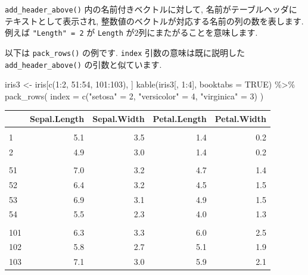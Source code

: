 \documentclass[
  11pt,
  lualatex,
  ja=standard]{bxjsreport}
\newenvironment{Shaded}{\begin{snugshade}}{\end{snugshade}}
\newcommand{\AttributeTok}[1]{\textcolor[rgb]{0.77,0.63,0.00}{#1}}
\newcommand{\ConstantTok}[1]{\textcolor[rgb]{0.00,0.00,0.00}{#1}}
\newcommand{\DecValTok}[1]{\textcolor[rgb]{0.00,0.00,0.81}{#1}}
\newcommand{\FunctionTok}[1]{\textcolor[rgb]{0.00,0.00,0.00}{#1}}
\newcommand{\NormalTok}[1]{#1}
\newcommand{\OtherTok}[1]{\textcolor[rgb]{0.56,0.35,0.01}{#1}}
\newcommand{\SpecialCharTok}[1]{\textcolor[rgb]{0.00,0.00,0.00}{#1}}
\newcommand{\StringTok}[1]{\textcolor[rgb]{0.31,0.60,0.02}{#1}}
\begin{document}
\texttt{add\_header\_above()} 内の名前付きベクトルに対して, 名前がテーブルヘッダにテキストとして表示され, 整数値のベクトルが対応する名前の列の数を表します. 例えば \texttt{"Length" = 2} が \texttt{Length} が2列にまたがることを意味します.

以下は \texttt{pack\_rows()} の例です. \texttt{index} 引数の意味は既に説明した \texttt{add\_header\_above()} の引数と似ています.

\begin{Shaded}
\begin{Highlighting}[numbers=left,,]
\NormalTok{iris3 }\OtherTok{\textless{}{-}}\NormalTok{ iris[}\FunctionTok{c}\NormalTok{(}\DecValTok{1}\SpecialCharTok{:}\DecValTok{2}\NormalTok{, }\DecValTok{51}\SpecialCharTok{:}\DecValTok{54}\NormalTok{, }\DecValTok{101}\SpecialCharTok{:}\DecValTok{103}\NormalTok{), ]}
\FunctionTok{kable}\NormalTok{(iris3[, }\DecValTok{1}\SpecialCharTok{:}\DecValTok{4}\NormalTok{], }\AttributeTok{booktabs =} \ConstantTok{TRUE}\NormalTok{) }\SpecialCharTok{\%\textgreater{}\%} \FunctionTok{pack\_rows}\NormalTok{(}
  \AttributeTok{index =} \FunctionTok{c}\NormalTok{(}\StringTok{"setosa"} \OtherTok{=} \DecValTok{2}\NormalTok{, }\StringTok{"versicolor"} \OtherTok{=} \DecValTok{4}\NormalTok{, }\StringTok{"virginica"} \OtherTok{=} \DecValTok{3}\NormalTok{)}
\NormalTok{)}
\end{Highlighting}
\end{Shaded}

\begin{tabular}{lrrrr}
\toprule
  & Sepal.Length & Sepal.Width & Petal.Length & Petal.Width\\
\midrule
\addlinespace[0.3em]
\multicolumn{5}{l}{\textbf{setosa}}\\
\hspace{1em}1 & 5.1 & 3.5 & 1.4 & 0.2\\
\hspace{1em}2 & 4.9 & 3.0 & 1.4 & 0.2\\
\addlinespace[0.3em]
\multicolumn{5}{l}{\textbf{versicolor}}\\
\hspace{1em}51 & 7.0 & 3.2 & 4.7 & 1.4\\
\hspace{1em}52 & 6.4 & 3.2 & 4.5 & 1.5\\
\hspace{1em}53 & 6.9 & 3.1 & 4.9 & 1.5\\
\hspace{1em}54 & 5.5 & 2.3 & 4.0 & 1.3\\
\addlinespace[0.3em]
\multicolumn{5}{l}{\textbf{virginica}}\\
\hspace{1em}101 & 6.3 & 3.3 & 6.0 & 2.5\\
\hspace{1em}102 & 5.8 & 2.7 & 5.1 & 1.9\\
\hspace{1em}103 & 7.1 & 3.0 & 5.9 & 2.1\\
\bottomrule
\end{tabular}
\end{document}
